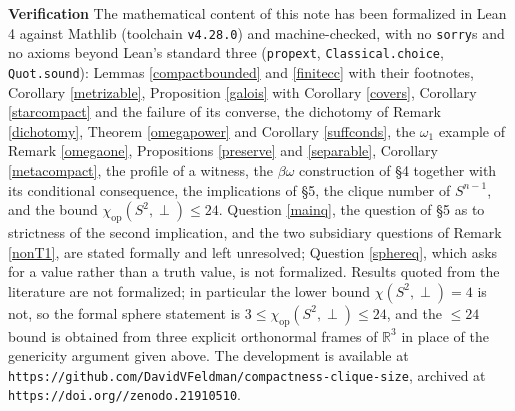 \documentclass[12pt]{article}
\newcommand{\R}{{\mathbb R}}
\newcommand{\chiop}{\chi_{\mathrm{op}}}
\theoremstyle{plain}
\theoremstyle{definition}
\theoremstyle{remark}
\begin{document}
{\sloppy
{\bf Verification} The mathematical content of this note has been formalized in Lean 4 against
Mathlib (toolchain \texttt{v4.28.0}) and machine-checked, with no {\tt sorry}s and no axioms
beyond Lean's standard three ({\tt propext}, {\tt Classical.choice}, {\tt Quot.sound}):
Lemmas \ref{compactbounded} and \ref{finitecc} with their footnotes, Corollary \ref{metrizable},
Proposition \ref{galois} with Corollary \ref{covers}, Corollary \ref{starcompact} and the failure
of its converse, the dichotomy of Remark \ref{dichotomy}, Theorem \ref{omegapower} and Corollary \ref{suffconds},
the $\omega_1$ example of Remark \ref{omegaone}, Propositions \ref{preserve} and \ref{separable},
Corollary \ref{metacompact}, the profile of a witness, the $\beta\omega$ construction of \S 4
together with its conditional consequence, the implications of \S 5, the clique number of
$S^{n-1}$, and the bound $\chiop(S^2,\perp) \leq 24$. Question \ref{mainq}, the question of \S 5
as to strictness of the second implication, and the two subsidiary questions of
Remark \ref{nonT1}, are stated formally and left unresolved; Question \ref{sphereq}, which asks
for a value rather than a truth value, is not formalized. Results quoted from the
literature are not formalized; in particular the lower bound $\chi(S^2,\perp) = 4$ is not, so the
formal sphere statement is $3 \leq \chiop(S^2,\perp) \leq 24$, and the $\leq 24$ bound is
obtained from three explicit orthonormal frames of $\R^3$ in place of the genericity argument
given above. The development is available at
\texttt{https://github.com/\allowbreak DavidVFeldman/\allowbreak compactness-clique-size},
archived at \texttt{https://doi.org//zenodo.21910510}.\par}
\end{document}
